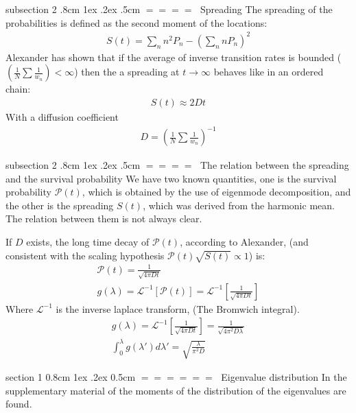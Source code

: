 \documentclass[onecolumn,fleqn,notitlepage,secnumarabic]{revtex4}
\makeatletter
\def\section{%
  \@startsection
    {section}%
    {1}%
    {\z@}%
    {0.8cm \@plus1ex \@minus .2ex}%
    {0.5cm}%
    {\Large\bf $=\!=\!=\!=\!=\!=\;$}%
}%
\def\subsection{%
  \@startsection
    {subsection}%
    {2}%
    {\z@}%
    {.8cm \@plus1ex \@minus .2ex}%
    {.5cm}%
    {\normalfont\small\bfseries$=\!=\!=\!=\;$}%
}%
\makeatother
\begin{document}
\subsection{Spreading}
The spreading of the probabilities is defined as the second moment of the locations:
\begin{align}
S(t) = \sum_n n^2 P_n -\left(\sum_n n P_n\right)^2
\end{align}
Alexander \cite{Alexander:1981:RMP} has shown that if the average of inverse transition rates is bounded ($\left(\frac{1}{N}\sum\frac{1}{w_n}\right) < \infty$) then the a spreading at $t\rightarrow \infty$ behaves like in an ordered chain:
\begin{align}
S(t) \approx 2Dt 
\end{align}
With a diffusion coefficient 
\begin{align}\label{eq:diff}
D = \left(\frac{1}{N}\sum\frac{1}{w_n}\right)^{-1}
\end{align}

\subsection{The relation between the spreading and the survival probability}
We have two known quantities, one is the survival probability $\mathcal{P}(t)$, which is obtained by the use of eigenmode decomposition, and the other is the spreading $S(t)$, which was derived from the harmonic mean. The relation between them is not always clear. 

If $D$ exists, the long time decay of $\mathcal{P}(t)$, according to Alexander, (and consistent with the scaling hypothesis $\mathcal{P}(t)\sqrt{S(t)} \propto 1$) is:
\begin{align}
    \mathcal{P}(t) = \frac{1}{\sqrt{4\pi D t}} \\
    g(\lambda) = \mathcal{L}^{-1}[\mathcal{P}(t)] = \mathcal{L}^{-1}\left[\frac{1}{\sqrt{4\pi D t}}\right]
\end{align}
Where $\mathcal{L}^{-1}$ is the inverse laplace transform, (The Bromwich integral).
\begin{align}
    g(\lambda) = \mathcal{L}^{-1}\left[\frac{1}{\sqrt{4\pi Dt}}\right] = \frac{1}{\sqrt{4\pi^2 D\lambda}} \\
    \int_0^\lambda g(\lambda')d\lambda' = \sqrt{\frac{\lambda}{\pi^2 D}}
\end{align}


\section{Eigenvalue distribution}
In the supplementary material of \cite{Amir:2010:PRL} the moments of the distribution of the eigenvalues are found. 
\end{document}
